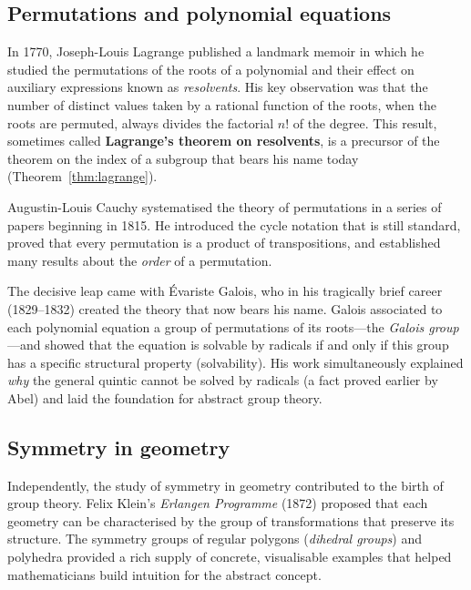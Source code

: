 \documentclass[12pt,a4paper,openany]{book}
\theoremstyle{definition}
\theoremstyle{remark}
\begin{document}
\subsection*{Permutations and polynomial equations}

In 1770, Joseph-Louis Lagrange published a
landmark memoir in which he studied the permutations of the roots of a
polynomial and their effect on auxiliary expressions known as
\emph{resolvents}.  His key observation was that the number of distinct
values taken by a rational function of the roots, when the roots are
permuted, always divides the factorial $n!$ of the degree.  This result,
sometimes called \textbf{Lagrange's theorem on resolvents}, is a precursor
of the theorem on the index of a subgroup that bears his name today
(Theorem~\ref{thm:lagrange}).

Augustin-Louis Cauchy systematised the theory
of permutations in a series of papers beginning in 1815.  He introduced the
cycle notation that is still standard, proved that
every permutation is a product of transpositions, and established many
results about the \emph{order} of a permutation.

The decisive leap came with \'Evariste Galois,
who in his tragically brief career (1829--1832) created the theory that now
bears his name.  Galois associated to each polynomial equation a group of
permutations of its roots---the \emph{Galois group}---and showed that the equation is solvable by radicals if and only if
this group has a specific structural property (solvability).  His work
simultaneously explained \emph{why} the general quintic cannot be solved by
radicals (a fact proved earlier by Abel) and laid
the foundation for abstract group theory.

\subsection*{Symmetry in geometry}

Independently, the study of symmetry in geometry contributed to the birth of
group theory.  Felix Klein's \emph{Erlangen Programme}
(1872) proposed that each geometry can be characterised by the group of
transformations that preserve its structure.  The symmetry groups of regular
polygons (\emph{dihedral groups}) and polyhedra
provided a rich supply of concrete, visualisable examples that helped
mathematicians build intuition for the abstract concept.
\end{document}
